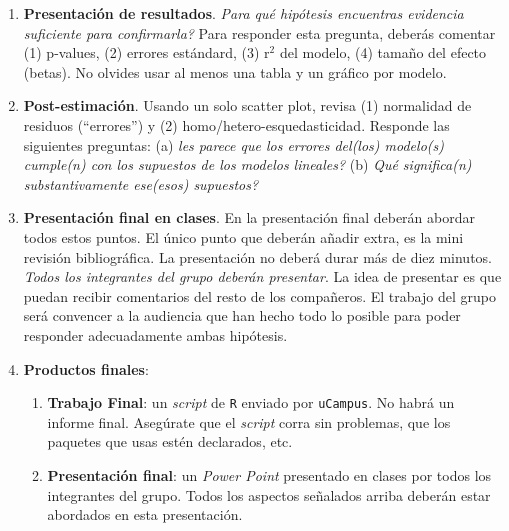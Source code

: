 \documentclass[10pt]{article}
\begin{document}
\begin{enumerate}
	\item {\bf Presentaci\'on de resultados}. \emph{Para qu\'e hip\'otesis encuentras evidencia suficiente para confirmarla?} Para responder esta pregunta, deber\'as comentar (1) p-values, (2) errores est\'andard, (3) r$^{2}$ del modelo, (4) tama\~no del efecto (betas). No olvides usar al menos una tabla y un gr\'afico por modelo.

	\item {\bf Post-estimaci\'on}. Usando un solo scatter plot, revisa (1) normalidad de residuos (``errores'') y (2) homo/hetero-esquedasticidad. Responde las siguientes preguntas: (a) \emph{les parece que los errores del(los) modelo(s) cumple(n) con los supuestos de los modelos lineales?} (b) \emph{Qu\'e significa(n) substantivamente ese(esos) supuestos?}


	\item {\bf Presentaci\'on final en clases}. En la presentaci\'on final deber\'an abordar todos estos puntos. El \'unico punto que deber\'an a\~nadir extra, es la mini revisi\'on bibliogr\'afica. La presentaci\'on no deber\'a durar m\'as de diez minutos. \emph{Todos los integrantes del grupo deber\'an presentar}. La idea de presentar es que puedan recibir comentarios del resto de los compa\~neros. El trabajo del grupo ser\'a convencer a la audiencia que han hecho todo lo posible para poder responder adecuadamente ambas hip\'otesis.

	\item {\bf Productos finales}: 

		\begin{enumerate}
			\item {\bf Trabajo Final}: un \emph{script} de \texttt{R} enviado por \texttt{uCampus}. No habr\'a un informe final. Aseg\'urate que el \emph{script} corra sin problemas, que los paquetes que usas est\'en declarados, etc.
			\item {\bf Presentaci\'on final}: un \emph{Power Point} presentado en clases por todos los integrantes del grupo. Todos los aspectos se\~nalados arriba deber\'an estar abordados en esta presentaci\'on.
		\end{enumerate}

\end{enumerate}
\end{document}
